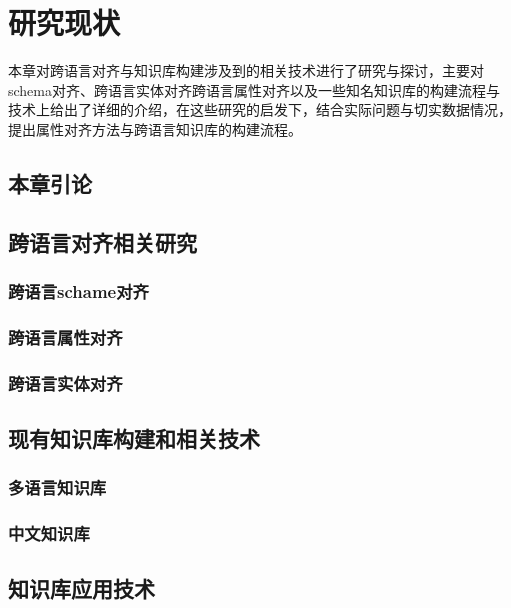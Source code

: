 \chapter{研究现状}
\label{cha:china}
本章对跨语言对齐与知识库构建涉及到的相关技术进行了研究与探讨，主要对schema对齐、跨语言实体对齐跨语言属性对齐以及一些知名知识库的构建流程与技术上给出了详细的介绍，在这些研究的启发下，结合实际问题与切实数据情况，提出属性对齐方法与跨语言知识库的构建流程。

\section{本章引论}
\label{sec:}

\section{跨语言对齐相关研究}
\label{sec:}

\subsection{跨语言schame对齐}
\label{sec:}

\subsection{跨语言属性对齐}
\label{sec:}

\subsection{跨语言实体对齐}
\label{sec:}

\section{现有知识库构建和相关技术}

\subsection{多语言知识库}
\label{sec:}

\subsection{中文知识库}
\label{sec:}

\section{知识库应用技术}

